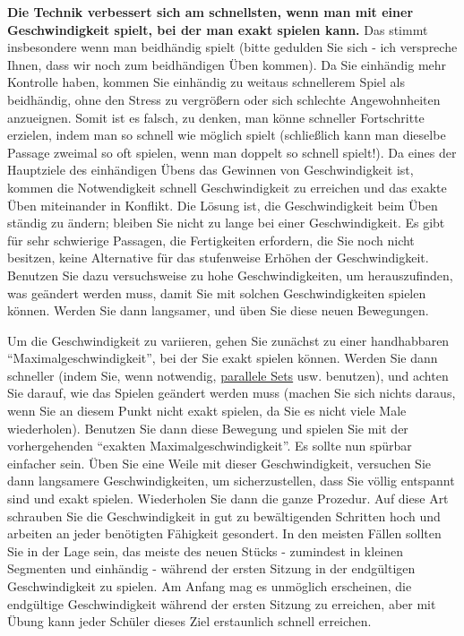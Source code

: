 \textbf{Die Technik verbessert sich am schnellsten, wenn man mit einer Geschwindigkeit spielt, bei der man exakt spielen kann.}
Das stimmt insbesondere wenn man beidhändig spielt (bitte gedulden Sie sich - ich verspreche Ihnen, dass wir noch zum beidhändigen Üben kommen).
Da Sie einhändig mehr Kontrolle haben, kommen Sie einhändig zu weitaus schnellerem Spiel als beidhändig, ohne den Stress zu vergrößern oder sich schlechte Angewohnheiten anzueignen.
Somit ist es falsch, zu denken, man könne schneller Fortschritte erzielen, indem man so schnell wie möglich spielt (schließlich kann man dieselbe Passage zweimal so oft spielen, wenn man doppelt so schnell spielt!).
Da eines der Hauptziele des einhändigen Übens das Gewinnen von Geschwindigkeit ist, kommen die Notwendigkeit schnell Geschwindigkeit zu erreichen und das exakte Üben miteinander in Konflikt.
Die Lösung ist, die Geschwindigkeit beim Üben ständig zu ändern; bleiben Sie nicht zu lange bei einer Geschwindigkeit.
Es gibt für sehr schwierige Passagen, die Fertigkeiten erfordern, die Sie noch nicht besitzen, keine Alternative für das stufenweise Erhöhen der Geschwindigkeit.
Benutzen Sie dazu versuchsweise zu hohe Geschwindigkeiten, um herauszufinden, was geändert werden muss, damit Sie mit solchen Geschwindigkeiten spielen können.
Werden Sie dann langsamer, und üben Sie diese neuen Bewegungen.

Um die Geschwindigkeit zu variieren, gehen Sie zunächst zu einer handhabbaren \enquote{Maximalgeschwindigkeit}, bei der Sie exakt spielen können.
Werden Sie dann schneller (indem Sie, wenn notwendig, \hyperref[c1ii11]{parallele Sets} usw. benutzen), und achten Sie darauf, wie das Spielen geändert werden muss (machen Sie sich nichts daraus, wenn Sie an diesem Punkt nicht exakt spielen, da Sie es nicht viele Male wiederholen).
Benutzen Sie dann diese Bewegung und spielen Sie mit der vorhergehenden \enquote{exakten Maximalgeschwindigkeit}.
Es sollte nun spürbar einfacher sein.
Üben Sie eine Weile mit dieser Geschwindigkeit, versuchen Sie dann langsamere Geschwindigkeiten, um sicherzustellen, dass Sie völlig entspannt sind und exakt spielen.
Wiederholen Sie dann die ganze Prozedur.
Auf diese Art schrauben Sie die Geschwindigkeit in gut zu bewältigenden Schritten hoch und arbeiten an jeder benötigten Fähigkeit gesondert.
In den meisten Fällen sollten Sie in der Lage sein, das meiste des neuen Stücks - zumindest in kleinen Segmenten und einhändig - während der ersten Sitzung in der endgültigen Geschwindigkeit zu spielen.
Am Anfang mag es unmöglich erscheinen, die endgültige Geschwindigkeit während der ersten Sitzung zu erreichen, aber mit Übung kann jeder Schüler dieses Ziel erstaunlich schnell erreichen.
 

